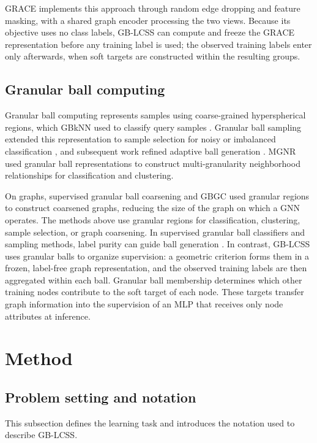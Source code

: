 \documentclass[a4paper,fleqn]{cas-sc}
\theoremstyle{definition}
\theoremstyle{plain}
\begin{document}
GRACE \cite{ref12} implements this approach through random edge dropping and feature masking, with a shared graph encoder processing the two views. Because its objective uses no class labels, GB-LCSS can compute and freeze the GRACE representation before any training label is used; the observed training labels enter only afterwards, when soft targets are constructed within the resulting groups.

\subsection{Granular ball computing}\label{sec:2.5}

Granular ball computing represents samples using coarse-grained hyperspherical regions, which GBkNN used to classify query samples \cite{ref13}. Granular ball sampling extended this representation to sample selection for noisy or imbalanced classification \cite{ref15}, and subsequent work refined adaptive ball generation \cite{ref16}. MGNR \cite{ref58} used granular ball representations to construct multi-granularity neighborhood relationships for classification and clustering.

On graphs, supervised granular ball coarsening \cite{ref66} and GBGC \cite{ref67} used granular regions to construct coarsened graphs, reducing the size of the graph on which a GNN operates. The methods above use granular regions for classification, clustering, sample selection, or graph coarsening. In supervised granular ball classifiers and sampling methods, label purity can guide ball generation \cite{ref13,ref15,ref16}. In contrast, GB-LCSS uses granular balls to organize supervision: a geometric criterion forms them in a frozen, label-free graph representation, and the observed training labels are then aggregated within each ball. Granular ball membership determines which other training nodes contribute to the soft target of each node. These targets transfer graph information into the supervision of an MLP that receives only node attributes at inference.
\section{Method}\label{sec:3}

\subsection{Problem setting and notation}\label{sec:3.1}

This subsection defines the learning task and introduces the notation used to describe GB-LCSS.
\end{document}
